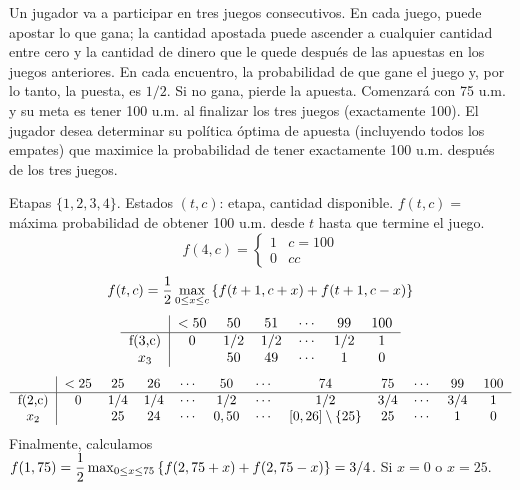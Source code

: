 \documentclass[twoside]{article}
\begin{document}
\newpage 
\begin{ejercicio}{6}\label{6}
Un jugador va a participar en tres juegos consecutivos. En cada juego, puede apostar lo que gana; la cantidad apostada puede ascender a cualquier cantidad entre cero y la cantidad de dinero que le quede después de las apuestas en los juegos anteriores. En cada encuentro, la probabilidad de que gane el juego y, por lo tanto, la puesta, es $1/2$. Si no gana, pierde la apuesta. Comenzará con 75 u.m. y su meta es tener 100 u.m. al finalizar los tres juegos (exactamente 100). El jugador desea determinar su política óptima de apuesta (incluyendo todos los empates) que maximice la probabilidad de tener exactamente 100 u.m. después de los tres juegos.
\end{ejercicio}
\begin{solucion}
Etapas $\{1,2,3,4\}$. Estados $(t,c)$: etapa, cantidad disponible.
$f(t,c)=$ máxima probabilidad de obtener 100 u.m. desde $t$ hasta que termine el juego.
$$f(4,c)=\begin{cases}
1 & c=100\\
0 & cc
\end{cases}$$
$$f(t,c)= \frac{1}{2}\max_{0\leq x\leq c}{\left\{f(t+1,c+x)+f(t+1,c-x)\right\}}$$
\begin{equation*}
\begin{tabular}{c|cccccc}
		& $<50$	& 50 	& 51 & $\cdots$	& 99 & 100\\
\hline
f(3,c)  & 0 			& $1/2$ 	& $1/2$ &$\cdots$& $1/2$ &  1\\
$x_3$     &   			& 50 	& 49 &	$\cdots$ & $1$  &  0\\ 
\end{tabular}
\end{equation*}
\begin{equation*}
\begin{tabular}{c|cccccccccccc}
		& $<25$	& 25 	& 26 & 		$\cdots$	& 50 & $\cdots$ & 74 & 75 & $\cdots$ & 99 & 100\\
\hline
f(2,c)  & 0 & $1/4$	& $1/4$ & $\cdots$& $1/2$ &$\cdots$& $1/2$ & $3/4$ &$\cdots$  & $3/4$ &1\\
$x_2$     &  & 25 & 24 &	$\cdots$ & $0,50$  & $\cdots$  &$[0,26]\setminus\{25\}$ & $25$ & $\cdots$ & $1$ &0\\ 
\end{tabular}
\end{equation*}
Finalmente, calculamos $f(1,75)=\dfrac{1}{2}\max_{0\leq x\leq 75}{\left\{f(2,75+x)+f(2,75-x)\right\}}=3/4$. Si $x=0$ o $x=25$. 
\end{solucion}
\end{document}
